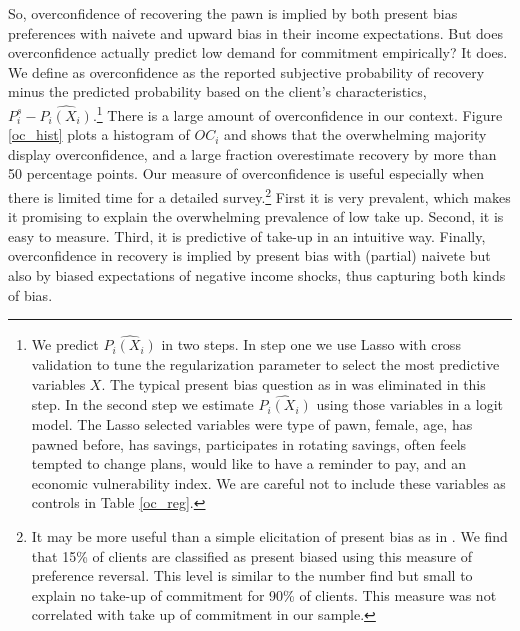 \documentclass[oneside,11pt]{article}
\begin{document}
So, overconfidence of recovering the pawn is implied by both present bias preferences with naivete and upward bias in their income expectations. But does overconfidence actually predict low demand for commitment empirically? It does. We define as overconfidence as the reported subjective probability of recovery minus the predicted probability based on the client's characteristics, $P^s_i-\widehat{P_i(X_i)}$.\footnote{We predict $\widehat{P_i(X_i)}$ in two steps. In step one we use Lasso with cross validation to tune the regularization parameter to select the most predictive variables $X$. The typical present bias question as in \cite{Ashraf} was eliminated in this step. In the second step we estimate $\widehat{P_i(X_i)}$ using those variables in a logit model. The Lasso selected variables were type of pawn, female, age, has pawned before, has savings, participates in rotating savings, often feels tempted to change plans, would like to have a reminder to pay, and an economic vulnerability index. We are careful not to include these variables as controls in Table  \ref{oc_reg}.} There is a large amount of overconfidence in our context. Figure \ref{oc_hist} plots a histogram of $OC_i$ and shows that the overwhelming majority display overconfidence, and a large fraction overestimate recovery by more than 50 percentage points. Our measure of overconfidence is useful especially when there is limited time for a detailed survey.\footnote{It may be more useful than a simple elicitation of present bias as in \cite{Ashraf}. We find that 15\% of clients are classified as present biased using this measure of preference reversal. This level is similar to the number \cite{Ashraf} find but small to explain no take-up of commitment for 90\% of clients. This measure was not correlated with take up of commitment in our sample.} First it is very prevalent, which makes it promising to explain the overwhelming prevalence of low take up. Second, it is easy to measure. Third, it is predictive of take-up in an intuitive way. Finally, overconfidence in recovery is implied by present bias with (partial) naivete but also by biased expectations of negative income shocks, thus capturing both kinds of bias. 
\end{document}
